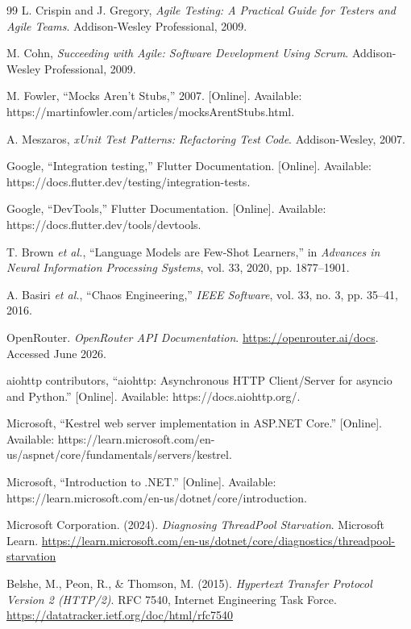 \begin{thebibliography}{99}
L. Crispin and J. Gregory, \textit{Agile Testing: A Practical Guide for Testers and Agile Teams}. Addison-Wesley Professional, 2009.

M. Cohn, \textit{Succeeding with Agile: Software Development Using Scrum}. Addison-Wesley Professional, 2009.

M. Fowler, ``Mocks Aren't Stubs,'' 2007. [Online]. Available: https://martinfowler.com/articles/mocksArentStubs.html.

A. Meszaros, \textit{xUnit Test Patterns: Refactoring Test Code}. Addison-Wesley, 2007.

Google, ``Integration testing,'' Flutter Documentation. [Online]. Available: https://docs.flutter.dev/testing/integration-tests.

Google, ``DevTools,'' Flutter Documentation. [Online]. Available: https://docs.flutter.dev/tools/devtools.

T. Brown \textit{et al.}, ``Language Models are Few-Shot Learners,'' in \textit{Advances in Neural Information Processing Systems}, vol. 33, 2020, pp. 1877--1901.

A. Basiri \textit{et al.}, ``Chaos Engineering,'' \textit{IEEE Software}, vol. 33, no. 3, pp. 35--41, 2016.

OpenRouter. \textit{OpenRouter API Documentation}. \url{https://openrouter.ai/docs}. Accessed June 2026.

aiohttp contributors, ``aiohttp: Asynchronous HTTP Client/Server for asyncio and Python.'' [Online]. Available: https://docs.aiohttp.org/.

Microsoft, ``Kestrel web server implementation in ASP.NET Core.'' [Online]. Available: https://learn.microsoft.com/en-us/aspnet/core/fundamentals/servers/kestrel.

Microsoft, ``Introduction to .NET.'' [Online]. Available: https://learn.microsoft.com/en-us/dotnet/core/introduction.

Microsoft Corporation. (2024). \textit{Diagnosing ThreadPool Starvation}. Microsoft Learn. \url{https://learn.microsoft.com/en-us/dotnet/core/diagnostics/threadpool-starvation}

Belshe, M., Peon, R., \& Thomson, M. (2015). \textit{Hypertext Transfer Protocol Version 2 (HTTP/2)}. RFC 7540, Internet Engineering Task Force. \url{https://datatracker.ietf.org/doc/html/rfc7540}


\end{thebibliography}

